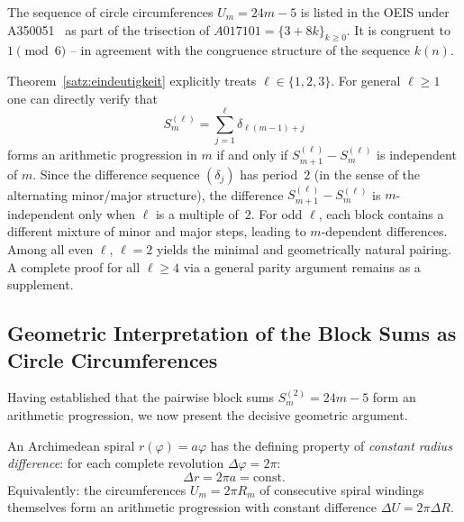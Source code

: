 \begin{bemerkung}
	The sequence of circle circumferences $U_m = 24m - 5$ is listed in the OEIS
	under A350051~\cite{OEIS} as part of the trisection
	of $A017101 = \{3 + 8k\}_{k \geq 0}$. It is congruent to
	$1 \pmod{6}$ -- in agreement with the congruence structure
	of the sequence $k(n)$.
\end{bemerkung}

\begin{anmerkung}
Theorem~\ref{satz:eindeutigkeit} explicitly treats $\ell \in \{1,2,3\}$.
For general $\ell \geq 1$ one can directly verify that
\[
  S_m^{(\ell)} = \sum_{j=1}^{\ell} \delta_{\ell(m-1)+j}
\]
forms an arithmetic progression in $m$ if and only if
$S_{m+1}^{(\ell)} - S_m^{(\ell)}$ is independent of $m$.
Since the difference sequence $(\delta_j)$ has period~$2$
(in the sense of the alternating minor/major structure),
the difference $S_{m+1}^{(\ell)} - S_m^{(\ell)}$ is
$m$-independent only when $\ell$ is a multiple of~$2$.
For odd $\ell$, each block contains a different mixture
of minor and major steps, leading to $m$-dependent differences.
Among all even $\ell$, $\ell = 2$ yields the minimal and
geometrically natural pairing. A complete proof for all
$\ell \geq 4$ via a general parity argument remains as
a supplement.
\end{anmerkung}

\subsection{Geometric Interpretation of the Block Sums as Circle Circumferences}
\label{subsec:geometrische_interpretation}

Having established that the pairwise block sums $S_m^{(2)} = 24m - 5$ form an arithmetic
progression, we now present the decisive geometric argument.

An Archimedean spiral $r(\varphi) = a\varphi$ has the defining
property of \emph{constant radius difference}: for each complete
revolution $\Delta\varphi = 2\pi$:
\[
  \Delta r = 2\pi a = \text{const}.
\]
Equivalently: the circumferences $U_m = 2\pi R_m$ of consecutive
spiral windings themselves form an arithmetic progression with constant
difference $\Delta U = 2\pi \Delta R$.
\clearpage

